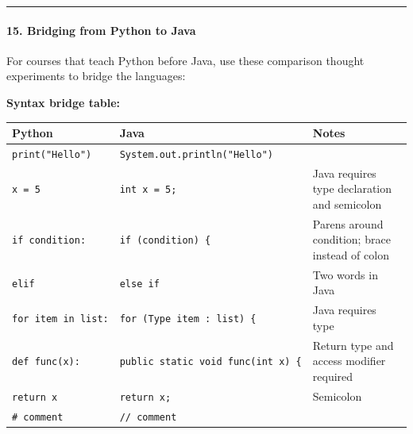 \documentclass[
  justified,
  openright,
]{tufte-book}
\let\subsection\paragraph
\let\paragraph\paragraph
\let\subsection\paragraph
\let\paragraph\paragraph
\begin{document}
\begin{center}\rule{0.5\linewidth}{0.5pt}\end{center}

\subsection{15. Bridging from Python to
Java}\label{bridging-from-python-to-java}

For courses that teach Python before Java, use these comparison thought
experiments to bridge the languages:

\textbf{Syntax bridge table:}

\begin{fullwidth}{\def\LTcaptype{none} %
\begin{longtable}[]{@{}
  >{\raggedright\arraybackslash}p{}
  >{\raggedright\arraybackslash}p{}
  >{\raggedright\arraybackslash}p{}@{}}
\toprule\noalign{}
\begin{minipage}[b]{\linewidth}\raggedright
Python
\end{minipage} & \begin{minipage}[b]{\linewidth}\raggedright
Java
\end{minipage} & \begin{minipage}[b]{\linewidth}\raggedright
Notes
\end{minipage} \\
\midrule\noalign{}
\endhead
\bottomrule\noalign{}
\endlastfoot
\texttt{print("Hello")} & \texttt{System.out.println("Hello")} & \\
\texttt{x\ =\ 5} & \texttt{int\ x\ =\ 5;} & Java requires type
declaration and semicolon \\
\texttt{if\ condition:} & \texttt{if\ (condition)\ \{} & Parens around
condition; brace instead of colon \\
\texttt{elif} & \texttt{else\ if} & Two words in Java \\
\texttt{for\ item\ in\ list:} & \texttt{for\ (Type\ item\ :\ list)\ \{}
& Java requires type \\
\texttt{def\ func(x):} & \texttt{public\ static\ void\ func(int\ x)\ \{}
& Return type and access modifier required \\
\texttt{return\ x} & \texttt{return\ x;} & Semicolon \\
\texttt{\#\ comment} & \texttt{//\ comment} & \\

\end{longtable}}
\end{fullwidth}
\end{document}
